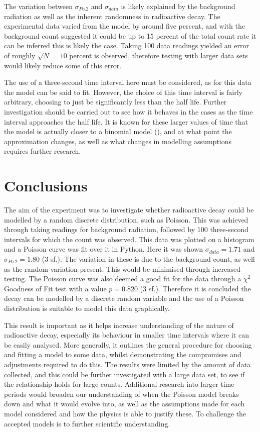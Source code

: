 \documentclass[11pt]{article}
\begin{document}
\noindent The variation between $\sigma_{Po.2}$ and $\sigma_{data}$ is likely explained by the background radiation as well as the inherent randomness in radioactive decay. The experimental data varied from the model by around five percent, and with the background count suggested it could be up to 15 percent of the total count rate it can be inferred this is likely the case. Taking 100 data readings yielded an error of roughly $\sqrt{N} = 10$ percent is observed, therefore testing with larger data sets would likely reduce some of this error.  

\noindent The use of a three-second time interval here must be considered, as for this data the model can be said to fit. However, the choice of this time interval is fairly arbitrary, choosing to just be significantly less than the half life. Further investigation should be carried out to see how it behaves in the cases as the time interval approaches the half life. It is known for these larger values of time that the model is actually closer to a binomial model (\cite{SITEK20151105}), and at what point the approximation changes, as well as what changes in modelling assumptions requires further research.
    \section{Conclusions}
The aim of the experiment was to investigate whether radioactive decay could be modelled by a random discrete distribution, such as Poisson. This was achieved through taking readings for background radiation, followed by 100 three-second intervals for which the count was observed. This data was plotted on a histogram and a Poisson curve was fit over it in Python. Here it was shown $\sigma_{data} = 1.71$ and $\sigma_{Po.2} = 1.80$ (3 sf.). The variation in these is due to the background count, as well as the random variation present. This would be minimised through increased testing. The Poisson curve was also deemed a good fit for the data through a $\chi^{2}$ Goodness of Fit test with a value $p = 0.820$ (3 sf.). Therefore it is  concluded the decay can be modelled by a discrete random variable and the use of a Poisson distribution is suitable to model this data graphically.

\noindent This result is important as it helps increase understanding of the nature of radioactive decay, especially its behaviour in smaller time intervals where it can be easily analysed. More generally, it outlines the general procedure for choosing and fitting a model to some data, whilst demonstrating the compromises and adjustments required to do this. The results were limited by the amount of data collected, and this could be further investigated with a large data set, to see if the relationship holds for large counts. Additional research into larger time periods would broaden our understanding of when the Poisson model breaks down and what it would evolve into, as well as the assumptions made for each model considered and how the physics is able to justify these. To challenge the accepted models is to further scientific understanding.
\end{document}
